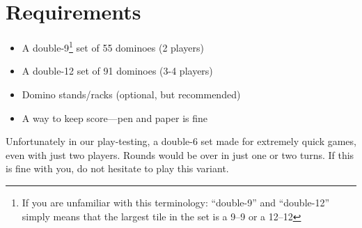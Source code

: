 \section{Requirements}
\begin{itemize}
    \item A double-9\footnote{If you are unfamiliar with this terminology: ``double-9'' and ``double-12'' simply means that the largest tile in the set is a 9--9 or a 12--12} set of 55 dominoes (2 players)
    \item A double-12 set of 91 dominoes (3-4 players)
    \item Domino stands/racks (optional, but recommended)
    \item A way to keep score---pen and paper is fine
\end{itemize}

\aside Unfortunately in our play-testing, a double-6 set made for extremely quick games, even with just two players. Rounds would be over in just one or two turns. If this is fine with you, do not hesitate to play this variant.